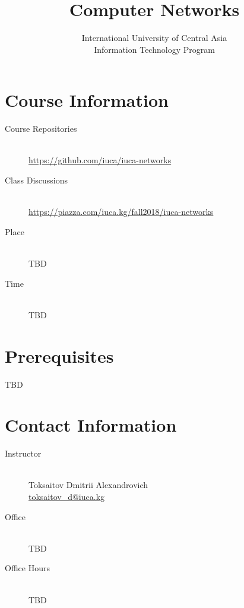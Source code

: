 \documentclass[12pt,a4paper,oneside]{article}
\begin{document}
    \title{Computer Networks}
    \author{
        International University of Central Asia\\
        Information Technology Program
    }
    \date{}
    \maketitle

    \section{Course Information}

        \begin{description}
            \item[Course Repositories]\hfill\\
                \url{https://github.com/iuca/iuca-networks}
            \item[Class Discussions]\hfill\\
                \url{https://piazza.com/iuca.kg/fall2018/iuca-networks}
            \item[Place]\hfill\\
                TBD
            \item[Time]\hfill\\
                TBD
        \end{description}

    \section{Prerequisites}

        TBD

    \section{Contact Information}

        \begin{description}
            \item[Instructor]\hfill\\
                Toksaitov Dmitrii Alexandrovich\\
                \href{mailto:toksaitov_d@iuca.kg}{toksaitov\_d@iuca.kg}
            \item[Office]\hfill\\
                TBD
            \item[Office Hours]\hfill\\
                TBD
        \end{description}
\end{document}
